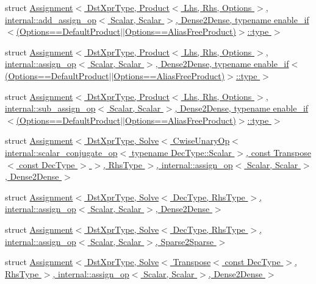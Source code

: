 \begin{DoxyCompactItemize}
\item 
struct \hyperlink{struct_eigen_1_1internal_1_1_assignment_3_01_dst_xpr_type_00_01_product_3_01_lhs_00_01_rhs_00_01fcb8254334c8007b54d75ff97f0106b6}{Assignment$<$ Dst\+Xpr\+Type, Product$<$ Lhs, Rhs, Options $>$, internal\+::add\+\_\+assign\+\_\+op$<$ Scalar, Scalar $>$, Dense2\+Dense, typename enable\+\_\+if$<$(\+Options==\+Default\+Product$\vert$$\vert$\+Options==\+Alias\+Free\+Product)$>$\+::type $>$}
\item 
struct \hyperlink{struct_eigen_1_1internal_1_1_assignment_3_01_dst_xpr_type_00_01_product_3_01_lhs_00_01_rhs_00_01210f0144945968db9352753c942f6951}{Assignment$<$ Dst\+Xpr\+Type, Product$<$ Lhs, Rhs, Options $>$, internal\+::assign\+\_\+op$<$ Scalar, Scalar $>$, Dense2\+Dense, typename enable\+\_\+if$<$(\+Options==\+Default\+Product$\vert$$\vert$\+Options==\+Alias\+Free\+Product)$>$\+::type $>$}
\item 
struct \hyperlink{struct_eigen_1_1internal_1_1_assignment_3_01_dst_xpr_type_00_01_product_3_01_lhs_00_01_rhs_00_01ed0bc91f79379e8268cc6b22ba7de0c6}{Assignment$<$ Dst\+Xpr\+Type, Product$<$ Lhs, Rhs, Options $>$, internal\+::sub\+\_\+assign\+\_\+op$<$ Scalar, Scalar $>$, Dense2\+Dense, typename enable\+\_\+if$<$(\+Options==\+Default\+Product$\vert$$\vert$\+Options==\+Alias\+Free\+Product)$>$\+::type $>$}
\item 
struct \hyperlink{struct_eigen_1_1internal_1_1_assignment_3_01_dst_xpr_type_00_01_solve_3_01_cwise_unary_op_3_01in7a0cdfc0a6924bfcd9bc281e374a4ff8}{Assignment$<$ Dst\+Xpr\+Type, Solve$<$ Cwise\+Unary\+Op$<$ internal\+::scalar\+\_\+conjugate\+\_\+op$<$ typename Dec\+Type\+::\+Scalar $>$, const Transpose$<$ const Dec\+Type $>$ $>$, Rhs\+Type $>$, internal\+::assign\+\_\+op$<$ Scalar, Scalar $>$, Dense2\+Dense $>$}
\item 
struct \hyperlink{struct_eigen_1_1internal_1_1_assignment_3_01_dst_xpr_type_00_01_solve_3_01_dec_type_00_01_rhs_ty3ce26f5f592c582be15e9bcd7c0c0744}{Assignment$<$ Dst\+Xpr\+Type, Solve$<$ Dec\+Type, Rhs\+Type $>$, internal\+::assign\+\_\+op$<$ Scalar, Scalar $>$, Dense2\+Dense $>$}
\item 
struct \hyperlink{struct_eigen_1_1internal_1_1_assignment_3_01_dst_xpr_type_00_01_solve_3_01_dec_type_00_01_rhs_tyc354b114c08238e43cfacd9205f4688c}{Assignment$<$ Dst\+Xpr\+Type, Solve$<$ Dec\+Type, Rhs\+Type $>$, internal\+::assign\+\_\+op$<$ Scalar, Scalar $>$, Sparse2\+Sparse $>$}
\item 
struct \hyperlink{struct_eigen_1_1internal_1_1_assignment_3_01_dst_xpr_type_00_01_solve_3_01_transpose_3_01const_002733ef61eadb9652bc6bc1dd0938391}{Assignment$<$ Dst\+Xpr\+Type, Solve$<$ Transpose$<$ const Dec\+Type $>$, Rhs\+Type $>$, internal\+::assign\+\_\+op$<$ Scalar, Scalar $>$, Dense2\+Dense $>$}

\end{DoxyCompactItemize}
